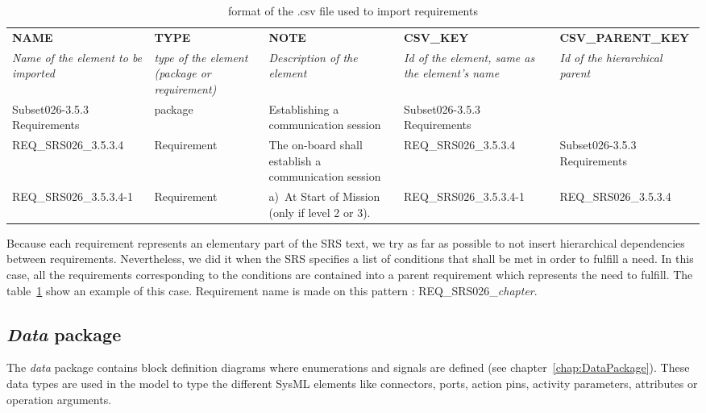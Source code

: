 \documentclass{template/openetcs_report}
\newcommand\refChapter[1]{chapter~\ref{#1}}
\newcommand\refTable[1]{table~\ref{#1}}
\newcommand\packageName[1]{\emph{#1}}
\begin{document}
\begin{table}
	\begin{center} \scriptsize
		\begin{tabular} {|p{3.7cm}|p{2cm}|p{3cm}|p{2.8cm}|p{2.8cm}|}
		\hline
			
			\textbf{NAME}&\textbf{TYPE}&\textbf{NOTE}&\textbf{CSV\_KEY}&\textbf{CSV\_PARENT\_KEY} \\
			
			\textsl{Name of the element to be imported}&\textsl{type of the element (package or requirement)}&\textsl{Description of the element}&\textsl{Id of the element, same as the element's name}&\textsl{Id of the hierarchical parent} \\ \hline
			
			Subset026-3.5.3 Requirements&package&Establishing a communication session&Subset026-3.5.3 Requirements& \\ 
			
			REQ\_SRS026\_3.5.3.4&	Requirement&	The on-board shall establish a communication session&	REQ\_SRS026\_3.5.3.4&	Subset026-3.5.3 Requirements \\ 
			
			REQ\_SRS026\_3.5.3.4-1&	Requirement&	a) At Start of Mission (only if level 2 or 3).&	REQ\_SRS026\_3.5.3.4-1&	REQ\_SRS026\_3.5.3.4\\
			
		\hline
		\end{tabular}
	\end{center}
	\caption{format of the .csv file used to import requirements}
	\label{tab:CsvFileFormat}
\end{table}

Because each requirement represents an elementary part of the SRS text, we try as far as possible to not insert hierarchical dependencies between requirements. Nevertheless, we did it when the SRS specifies a list of conditions that shall be met in order to fulfill a need. In this case, all the requirements corresponding to the conditions are contained into a parent requirement which represents the need to fulfill. The \refTable{tab:CsvFileFormat} show an example of this case. Requirement name is made on this pattern : REQ\_SRS026\_\emph{chapter}.

\subsection{\packageName{Data} package}

The \packageName{data} package contains block definition diagrams where enumerations and signals are defined (see \refChapter{chap:DataPackage}). These data types are used in the model to type the different SysML elements like connectors, ports, action pins, activity parameters, attributes or operation arguments. 
\end{document}
